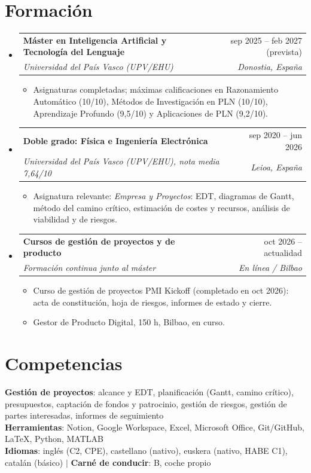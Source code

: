 \documentclass[a4paper,10pt]{article}
\makeatletter
\newcommand{\resumeItem}[1]{\item\small{{#1 \vspace{-2.5pt}}}}
\newcommand{\resumeSubheading}[4]{
  \vspace{3pt}\item
    \begin{tabular*}{\textwidth}[t]{l@{\extracolsep{\fill}}r}
      \textbf{#1} & \small #2 \\
      \textit{\small#3} & \textit{\small #4} \\
    \end{tabular*}\vspace{-6pt}
}
\newcommand{\resumeSubHeadingListStart}{\begin{itemize}[leftmargin=0.0in, label={}]}
\newcommand{\resumeSubHeadingListEnd}{\end{itemize}\vspace{-2pt}}
\newcommand{\resumeItemListStart}{\begin{itemize}[leftmargin=0.18in, topsep=2pt]}
\newcommand{\resumeItemListEnd}{\end{itemize}\vspace{-3pt}}
\makeatother
\begin{document}
\section{Formación}
  \resumeSubHeadingListStart
    \resumeSubheading
      {Máster en Inteligencia Artificial y Tecnología del Lenguaje}{sep 2025 -- feb 2027 (prevista)}
      {Universidad del País Vasco (UPV/EHU)}{Donostia, España}
      \resumeItemListStart
        \resumeItem{Asignaturas completadas; máximas calificaciones en Razonamiento Automático (10/10), Métodos de Investigación en PLN (10/10), Aprendizaje Profundo (9,5/10) y Aplicaciones de PLN (9,2/10).}
      \resumeItemListEnd
    \resumeSubheading
      {Doble grado: Física e Ingeniería Electrónica}{sep 2020 -- jun 2026}
      {Universidad del País Vasco (UPV/EHU), nota media 7,64/10}{Leioa, España}
      \resumeItemListStart
        \resumeItem{Asignatura relevante: \textit{Empresa y Proyectos}: EDT, diagramas de Gantt, método del camino crítico, estimación de costes y recursos, análisis de viabilidad y de riesgos.}
      \resumeItemListEnd
    \resumeSubheading
      {Cursos de gestión de proyectos y de producto}{oct 2026 -- actualidad}
      {Formación continua junto al máster}{En línea / Bilbao}
      \resumeItemListStart
        \resumeItem{Curso de gestión de proyectos PMI Kickoff (completado en oct 2026): acta de constitución, hoja de riesgos, informes de estado y cierre.}
        \resumeItem{Gestor de Producto Digital, 150 h, Bilbao, en curso.}
      \resumeItemListEnd
  \resumeSubHeadingListEnd

\section{Competencias}
 \begin{itemize}[leftmargin=0in, label={}]
    \small{\item{
     \textbf{Gestión de proyectos}{: alcance y EDT, planificación (Gantt, camino crítico), presupuestos, captación de fondos y patrocinio, gestión de riesgos, gestión de partes interesadas, informes de seguimiento} \\
     \textbf{Herramientas}{: Notion, Google Workspace, Excel, Microsoft Office, Git/GitHub, LaTeX, Python, MATLAB} \\
     \textbf{Idiomas}{: inglés (C2, CPE), castellano (nativo), euskera (nativo, HABE C1), catalán (básico)} $|$ \textbf{Carné de conducir}{: B, coche propio}
    }}
 \end{itemize}
\end{document}
